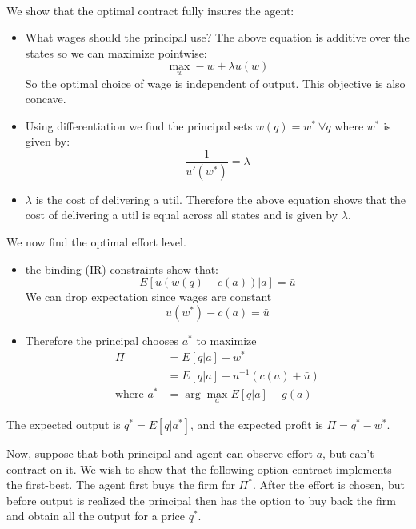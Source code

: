 \documentclass[answers]{exam}
\begin{document}
\begin{questions}
\begin{parts}
\begin{solution}
\begin{itemize}
\begin{align*}
            \end{align*}
            We show that the optimal contract fully insures the agent:
            \begin{itemize}
                \item What wages should the principal use? The above equation is additive over the states so we can maximize pointwise:
                $$\max_{w} -w +\lambda u(w)$$
                So the optimal choice of wage is independent of output. This objective is also concave.
                \item Using differentiation we find the principal sets $w(q) = w^* \ \forall q$ where $w^*$ is given by:
                $$\frac{1}{u'(w^*)} = \lambda$$
                \item $\lambda$ is the cost of delivering a util. Therefore the above equation shows that the cost of delivering a util is equal across all states and is given by $\lambda$.
                \end{itemize}
                We now find the optimal effort level.
                \begin{itemize}
                    \item the binding (IR) constraints show that:
                    $$
                        E[u(w(q) - c(a))|a] = \bar{u}
                    $$
                    We can drop expectation since wages are constant
                    $$u(w^*) -c(a) = \bar{u}$$
                    \item Therefore the principal chooses $a^*$ to maximize 
                    \begin{align*} 
                        \Pi &= E[q|a] - w^*\\
                        &= E[q|a] - u^{-1}(c(a)+\bar{u})\\
                        \text{where } a^* &= \arg \max_a E[q|a] - g(a)
                    \end{align*}
                \end{itemize}
                The expected output is $q^* = E[q|a^*]$, and the expected profit is $\Pi = q^* - w^*$.
        \end{itemize}


    \end{solution}
    Now, suppose that both principal and agent can observe effort $a$, but can't contract on it. We wish to show that the following option contract implements the first-best. The agent first buys the firm for $\Pi^*$. After the effort is chosen, but before output is realized the principal then has the option to buy back the firm and obtain all the output for a price $q^*$.

\end{parts}
\end{questions}
\end{document}
